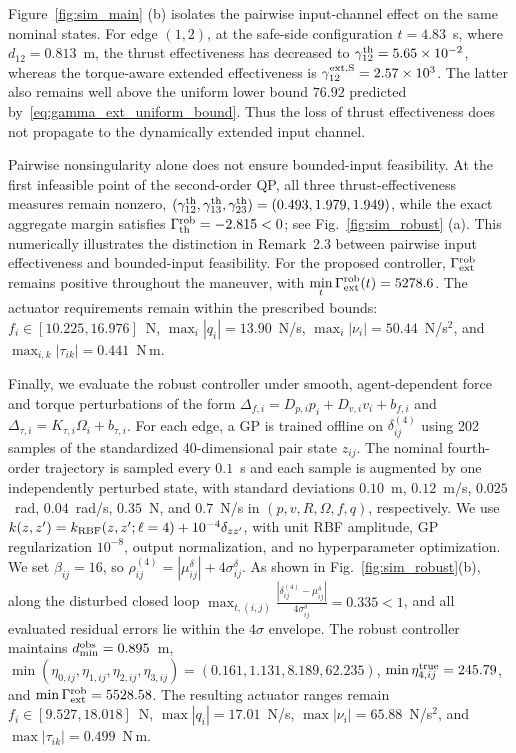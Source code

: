 \documentclass[journal,twoside,web]{ieeecolor}
\begin{document}
Figure~\ref{fig:sim_main} (b) isolates the pairwise input-channel
effect on the same nominal states. For edge $(1,2)$, at the safe-side
configuration $t=4.83$~s, where $d_{12}=0.813$~m, the thrust
effectiveness has decreased to $\gamma_{12}^{\rm th}=5.65\times10^{-2}$, whereas the torque-aware extended effectiveness is $\gamma_{12}^{\rm ext,S}=2.57\times10^{3}$. The latter also remains well above the uniform lower bound
$76.92$ predicted by~\eqref{eq:gamma_ext_uniform_bound}. Thus the loss of thrust
effectiveness does not propagate to the dynamically extended input
channel.


Pairwise nonsingularity alone does not ensure bounded-input
feasibility. At the first infeasible point of the second-order QP,
all three thrust-effectiveness measures remain nonzero,
$(\gamma_{12}^{\rm th},
 \gamma_{13}^{\rm th},
 \gamma_{23}^{\rm th})
= (0.493,1.979,1.949)$, while the exact aggregate margin satisfies
$\Gamma_{\rm th}^{\rm rob}=-2.815<0$; see
Fig.~\ref{fig:sim_robust} (a). This numerically illustrates the
distinction in Remark~2.3 between pairwise input effectiveness and
bounded-input feasibility. For the proposed controller,
$\Gamma_{\rm ext}^{\rm rob}$ remains positive throughout the
maneuver, with $\displaystyle{\min_t\Gamma_{\rm ext}^{\rm rob}(t)=5278.6}$. The actuator requirements remain within the prescribed
bounds:
$f_i\in[10.225,16.976]$~N,
$\max_i|q_i|=13.90$~N/s,
$\max_i|\nu_i|=50.44$~N/s$^2$, and
$\max_{i,k}|\tau_{ik}|=0.441$~N\,m.



Finally, we evaluate the robust controller under smooth,
agent-dependent force and torque perturbations of the form
$\Delta_{f,i}=D_{p,i}p_i+D_{v,i}v_i+b_{f,i}$ and
$\Delta_{\tau,i}=K_{\tau,i}\Omega_i+b_{\tau,i}$.
For each edge, a GP is trained offline on $\delta_{ij}^{(4)}$ using
202 samples of the standardized 40-dimensional pair state $z_{ij}$. The nominal fourth-order
trajectory is sampled every $0.1$~s and each sample is augmented by one
independently perturbed state, with standard deviations
$0.10$~m, $0.12$~m/s, $0.025$~rad, $0.04$~rad/s,
$0.35$~N, and $0.7$~N/s in
$(p,v,R,\Omega,f,q)$, respectively.
We use $k(z,z')
=
k_{\rm RBF}(z,z';\ell=4)+10^{-4}\delta_{zz'}$, with unit RBF amplitude, GP regularization $10^{-8}$,
output normalization, and no hyperparameter optimization.
We set $\beta_{ij}=16$, so
$\rho_{ij}^{(4)}=|\mu_{ij}^{\delta}|+4\sigma_{ij}^{\delta}$.
As shown in Fig.~\ref{fig:sim_robust}(b), along the disturbed
closed loop $\displaystyle{\max_{t,(i,j)}
\frac{|\delta_{ij}^{(4)}-\mu_{ij}^{\delta}|}
{4\sigma_{ij}^{\delta}}
=0.335<1}$, and all evaluated residual errors lie within the $4\sigma$ envelope.
The robust controller maintains $d_{\min}^{\rm obs}=0.895$~m,
$\min(\eta_{0,ij},\eta_{1,ij},\eta_{2,ij},\eta_{3,ij})
=(0.161,1.131,8.189,62.235)$,
$\min\eta_{4,ij}^{\rm true}=245.79$, and
$\min\Gamma_{\rm ext}^{\rm rob}=5528.58$.
The resulting actuator ranges remain
$f_i\in[9.527,18.018]$~N,
$\max|q_i|=17.01$~N/s,
$\max|\nu_i|=65.88$~N/s$^2$, and
$\max|\tau_{ik}|=0.499$~N\,m.
\end{document}

